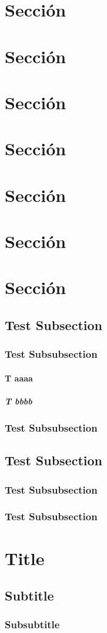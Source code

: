 \section{Sección}
\section{Sección}
\section{Sección}
\section{Sección}
\section{Sección}
\section{Sección}
\section{Sección}
\subsection{Test Subsection}
\subsubsection{Test Subsubsection}
\paragraph{T aaaa}
\subparagraph{T bbbb}
\subsubsection{Test Subsubsection}
\subsection{Test Subsection}
\subsubsection{Test Subsubsection}
\subsubsection{Test Subsubsection}

\clearpage

\section{Title}

\lipsum[5]

\subsection{Subtitle}

\lipsum[5]

\subsubsection{Subsubtitle}

\lipsum[5]


\lipsum[5]